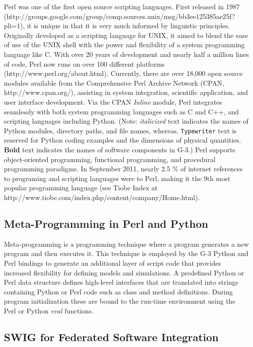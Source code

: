 \documentclass[10pt]{article}
\begin{document}
Perl was one of the first open source scripting languages. First
released in 1987
(http://groups.google.com/group/comp.sources.unix/msg/bb3ee125385ae25f?pli=1),
it is unique in that it is very much informed by linguistic
principles.  Originally developed as a scripting language for UNIX, it
aimed to blend the ease of use of the UNIX shell with the power and
flexibility of a system programming language like C.  With over 20
years of development and nearly half a million lines of code, Perl now
runs on over 100 different platforms (http://www.perl.org/about.html).  Currently, there are over 18,000
open source modules available from the Comprehensive Perl Archive
Network (CPAN, http://www.cpan.org/), assisting in system integration, scientific
application, and user interface development.  Via the CPAN {\it Inline}
module, Perl integrates seamlessly with both system programming
languages such as C and C++, and scripting languages including Python. (Note: {\it italicized} text indicates the names of Python modules, directory paths, and file names, whereas, {\tt Typewriter} text is reserved for Python coding examples and the dimensions of physical quantities. {\bf Bold} text indicates the names of software components in G-3.)
Perl supports object-oriented programming, functional programming, and
procedural programming paradigms. In September 2011, nearly
2.5 \% of internet references to programing and scripting languages were to Perl, making
it the 9th most popular programming
language (see Tiobe Index at http://www.tiobe.com/index.php/content/company/Home.html).

\subsection*{Meta-Programming in Perl and Python}

Meta-programming is a programming technique where a program generates
a new program and then executes it.  This technique is employed by
the G-3 Python and Perl bindings to generate an
additional layer of script code that provides increased flexibility
for defining models and simulations.  A predefined Python  or
Perl data structure defines high-level interfaces that are translated
into strings containing Python or Perl code such as class and method
definitions.  During program initialization these are bound to the run-time
environment using the Perl or Python {\it eval} functions.

\subsection*{SWIG for Federated Software Integration}
\end{document}

